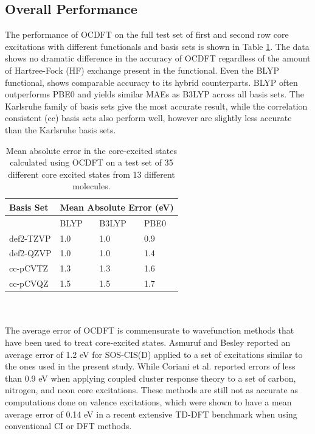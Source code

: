 \documentclass[11.5pt]{article}
\begin{document}
\subsection{Overall Performance}
The performance of OCDFT on the full test set of first and second row core excitations with different functionals and basis sets is shown in Table \ref{table:OverallPerformance}. The data shows no dramatic difference in the accuracy of OCDFT regardless of the amount of Hartree-Fock (HF) exchange present in the functional. Even the BLYP functional, shows comparable accuracy to its hybrid counterparts. BLYP often outperforms PBE0 and yields similar MAEs as B3LYP across all basis sets. The Karlsruhe family of basis sets give the most accurate result, while the correlation consistent (cc) basis sets also perform well, however are slightly less accurate than the Karlsruhe basis sets.
\begin{table}[!ht]
    \begin{tabular}{l@{\hskip 0.5in}lll}
    \hline
    \hline
Basis Set & \multicolumn{3}{c}{Mean Absolute Error (eV)}  \\
\hline
& BLYP & B3LYP & PBE0\\
def2-TZVP & 1.0 & 1.0 & 0.9 \\
def2-QZVP & 1.0 & 1.0 & 1.4 \\
cc-pCVTZ & 1.3 & 1.3 & 1.6 \\
cc-pCVQZ & 1.5 & 1.5 & 1.7 \\
\end{tabular}
    \caption{Mean absolute error in the core-excited states calculated using OCDFT on a test set of 35 different core excited states from 13 different molecules.}
    \label{table:OverallPerformance}
\end{table}
\\ \\ 
The average error of OCDFT is commensurate to wavefunction methods that have been used to treat core-excited states. Asmuruf and Besley\cite{asmuruf_calculation_2008} reported an average error of 1.2 eV for SOS-CIS(D) applied to a set of excitations similar to the ones used in the present study. While Coriani et al.\cite{coriani_coupled-cluster_2012} reported errors of less than 0.9 eV when applying coupled cluster response theory to a set of carbon, nitrogen, and neon core excitations. These methods are still not as accurate as computations done on valence excitations, which were shown to have a mean average error of 0.14 eV in a recent extensive TD-DFT benchmark when using conventional CI or DFT methods. \cite{jacquemin_extensive_2009} 
\end{document}
